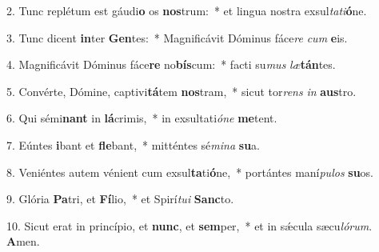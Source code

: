 2. Tunc replétum est gáudi\textbf{o} os \textbf{nos}trum:~*  et lingua nostra exsul\textit{ta}\textit{ti}\textbf{ó}ne.\

3. Tunc dicent \textbf{in}ter \textbf{Gen}tes:~*  Magnificávit Dóminus fáce\textit{re} \textit{cum} \textbf{e}is.\

4. Magnificávit Dóminus fáce\textbf{re} no\textbf{bís}cum:~*  facti su\textit{mus} \textit{læ}\textbf{tán}tes.\

5. Convérte, Dómine, captivi\textbf{tá}tem \textbf{nos}tram,~*  sicut tor\textit{rens} \textit{in} \textbf{aus}tro.\

6. Qui sémi\textbf{nant} in \textbf{lá}crimis,~*  in exsultati\textit{ó}\textit{ne} \textbf{me}tent.\

7. Eúntes \textbf{i}bant et \textbf{fle}bant,~*  mitténtes sé\textit{mi}\textit{na} \textbf{su}a.\

8. Veniéntes autem vénient cum exsul\textbf{ta}ti\textbf{ó}ne,~*  portántes maní\textit{pu}\textit{los} \textbf{su}os.\

9. Glória \textbf{Pa}tri, et \textbf{Fí}lio,~*  et Spirí\textit{tu}\textit{i} \textbf{Sanc}to.\

10. Sicut erat in princípio, et \textbf{nunc}, et \textbf{sem}per,~*  et in sǽcula sæcu\textit{ló}\textit{rum}. \textbf{A}men.\

